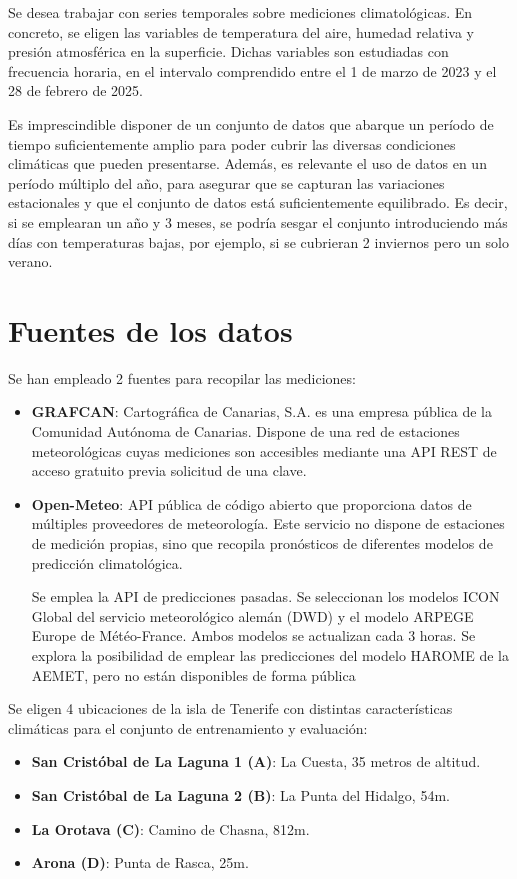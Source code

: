 
Se desea trabajar con series temporales sobre mediciones climatológicas. 
En concreto, se eligen las variables de temperatura del aire, humedad relativa y presión atmosférica en la superficie.
Dichas variables son estudiadas con frecuencia horaria, en el intervalo comprendido entre el 1 de marzo de 2023 y el 28 de febrero de 2025.

Es imprescindible disponer de un conjunto de datos que abarque un período de tiempo suficientemente amplio para poder cubrir las diversas condiciones climáticas que pueden presentarse.
Además, es relevante el uso de datos en un período múltiplo del año, para asegurar que se capturan las variaciones estacionales y que el conjunto de datos está suficientemente equilibrado.
Es decir, si se emplearan un año y 3 meses, se podría sesgar el conjunto introduciendo más días con temperaturas bajas, por ejemplo, si se cubrieran 2 inviernos pero un solo verano.

\section{Fuentes de los datos}

Se han empleado 2 fuentes para recopilar las mediciones: 
\begin{itemize}
    \item \textbf{GRAFCAN}: Cartográfica de Canarias, S.A. es una empresa pública de la Comunidad Autónoma de Canarias. Dispone de una red de estaciones meteorológicas cuyas
    mediciones son accesibles mediante una API REST de acceso gratuito previa solicitud de una clave\cite{GRAFCAN_sensores}. 
    \item \textbf{Open-Meteo}: API pública de código abierto que proporciona datos de múltiples proveedores de meteorología. Este servicio no dispone de estaciones de medición
    propias, sino que recopila pronósticos de diferentes modelos de predicción climatológica. 

    Se emplea la API de predicciones pasadas\cite{open_meteo_api}. Se seleccionan los modelos ICON Global del servicio meteorológico alemán (DWD) y el modelo ARPEGE Europe de Météo-France. Ambos modelos se actualizan cada 3 horas. 
    Se explora la posibilidad de emplear las predicciones del modelo HAROME de la AEMET, pero no están disponibles de forma pública
\end{itemize}

Se eligen 4 ubicaciones de la isla de Tenerife con distintas características climáticas para el conjunto de entrenamiento y evaluación:
\begin{itemize}
    \item \textbf{San Cristóbal de La Laguna 1 (A)}: La Cuesta, 35 metros de altitud.
    \item \textbf{San Cristóbal de La Laguna 2 (B)}: La Punta del Hidalgo, 54m.
    \item \textbf{La Orotava (C)}: Camino de Chasna, 812m.
    \item \textbf{Arona (D)}: Punta de Rasca, 25m.
\end{itemize}

